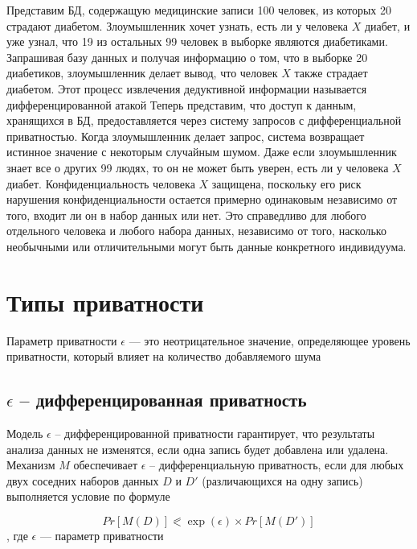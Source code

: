 Представим БД, содержащую медицинские записи 100 человек, из которых 20 страдают диабетом.
Злоумышленник хочет узнать, есть ли у человека $X$ диабет, и уже узнал, что 19 из остальных 99 человек в выборке являются диабетиками.
Запрашивая базу данных и получая информацию о том, что в выборке 20 диабетиков, злоумышленник делает вывод, что человек
$X$ также страдает диабетом.
Этот процесс извлечения дедуктивной информации называется дифференцированной атакой%
\newpage
Теперь представим, что доступ к данным, хранящихся в БД, предоставляется через систему запросов с дифференциальной приватностью.
Когда злоумышленник делает запрос, система возвращает истинное значение с некоторым случайным шумом.
Даже если злоумышленник знает все о других 99 людях, то он не может быть уверен, есть ли у человека $X$ диабет.
Конфиденциальность человека $X$ защищена, поскольку его риск нарушения конфиденциальности остается примерно одинаковым независимо от того, входит ли он в набор данных или нет.
Это справедливо для любого отдельного человека и любого набора данных, независимо от того, насколько необычными или отличительными могут быть данные конкретного индивидуума.%




\section{Типы приватности}

Параметр приватности $\epsilon$ --- это неотрицательное значение, определяющее уровень приватности, который влияет на количество добавляемого шума%

\subsection{$\epsilon$ -- дифференцированная приватность}
Модель $\epsilon$ -- дифференцированной приватности гарантирует, что результаты анализа данных не изменятся, если одна запись будет добавлена или удалена.%
\newpage
Механизм $M$ обеспечивает $\epsilon$ -- дифференциальную приватность, если для любых двух соседних наборов данных $D$ и $D'$ (различающихся на одну запись) выполняется условие по формуле%

\begin{equation}\label{equ:eps-diff}
	Pr[M(D)] \eqslantless \exp(\epsilon) \times Pr[M(D')]
\end{equation}
, где $\epsilon$ --- параметр приватности

